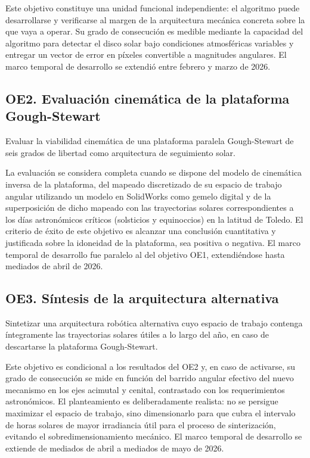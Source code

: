 Este objetivo constituye una unidad funcional independiente: el algoritmo puede desarrollarse y verificarse al margen de la arquitectura mecánica concreta sobre la que vaya a operar. Su grado de consecución es medible mediante la capacidad del algoritmo para detectar el disco solar bajo condiciones atmosféricas variables y entregar un vector de error en píxeles convertible a magnitudes angulares. El marco temporal de desarrollo se extendió entre febrero y marzo de 2026.

\subsection{OE2. Evaluación cinemática de la plataforma Gough-Stewart}
Evaluar la viabilidad cinemática de una plataforma paralela Gough-Stewart de seis grados de libertad como arquitectura de seguimiento solar.

La evaluación se considera completa cuando se dispone del modelo de cinemática inversa de la plataforma, del mapeado discretizado de su espacio de trabajo angular utilizando un modelo en SolidWorks como gemelo digital y de la superposición de dicho mapeado con las trayectorias solares correspondientes a los días astronómicos críticos (solsticios y equinoccios) en la latitud de Toledo. El criterio de éxito de este objetivo es alcanzar una conclusión cuantitativa y justificada sobre la idoneidad de la plataforma, sea positiva o negativa. El marco temporal de desarrollo fue paralelo al del objetivo OE1, extendiéndose hasta mediados de abril de 2026.

\subsection{OE3. Síntesis de la arquitectura alternativa}
Sintetizar una arquitectura robótica alternativa cuyo espacio de trabajo contenga íntegramente las trayectorias solares útiles a lo largo del año, en caso de descartarse la plataforma Gough-Stewart.

Este objetivo es condicional a los resultados del OE2 y, en caso de activarse, su grado de consecución se mide en función del barrido angular efectivo del nuevo mecanismo en los ejes acimutal y cenital, contrastado con los requerimientos astronómicos. El planteamiento es deliberadamente realista: no se persigue maximizar el espacio de trabajo, sino dimensionarlo para que cubra el intervalo de horas solares de mayor irradiancia útil para el proceso de sinterización, evitando el sobredimensionamiento mecánico. El marco temporal de desarrollo se extiende de mediados de abril a mediados de mayo de 2026.

